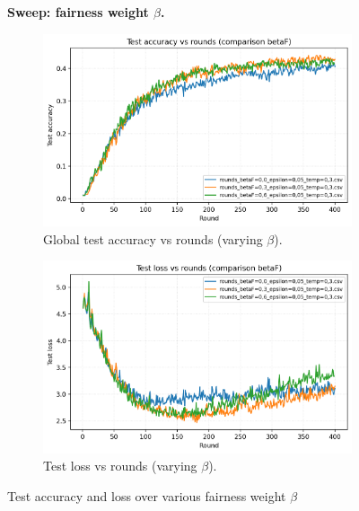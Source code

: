 \documentclass[10pt,twocolumn,letterpaper]{article}
\begin{document}
\begin{figure}[htbp]  
\noindent\textbf{Sweep: fairness weight \(\beta\).}

  \centering   

  \begin{subfigure}[b]{0.48\linewidth}

    \centering
    \includegraphics[width=\linewidth]{figs/compare_test_acc_betaF.png}
    \caption{Global test accuracy vs rounds (varying \(\beta\)).}
    \label{fig:beta-acc}
  \end{subfigure}
  \hfill
  \begin{subfigure}[b]{0.48\linewidth}
    \centering
    \includegraphics[width=\linewidth]{figs/compare_test_loss_betaF.png}
    \caption{Test loss vs rounds (varying \(\beta\)).}
    \label{fig:beta-loss}
  \end{subfigure}
  \caption{Test accuracy and loss over various fairness weight \(\beta\)  }
  \label{fig:beta-sweep}
\end{figure}
\FloatBarrier
\end{document}

